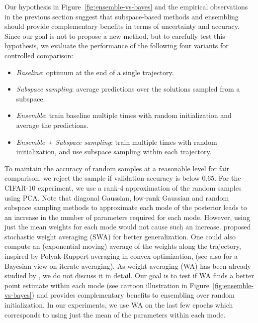 \documentclass{article}
\begin{document}
%

%

Our hypothesis in Figure~\ref{fig:ensemble-vs-bayes} and the empirical observations in the previous section suggest that subspace-based methods and ensembling should provide complementary benefits in terms of uncertainty and accuracy. %
%
%
%
%
Since our goal is not to propose a new method, but to carefully test this hypothesis, we
evaluate the performance of the following four variants for controlled comparison: %
\begin{itemize}\itemsep0em
\item \emph{Baseline}: optimum at the end of a single  trajectory.
\item \emph{Subspace sampling}: average predictions over the solutions sampled from a subspace.
\item \emph{Ensemble}: train baseline multiple times with random initialization and average the predictions.
\item \emph{Ensemble + Subspace sampling}: train multiple times with random initialization, and use subspace sampling within each trajectory.
\end{itemize}

{To maintain the accuracy of random samples at a reasonable level for fair comparison, we reject the sample if validation accuracy is below $0.65$. For the CIFAR-10 experiment, we  use a rank-4 approximation of the random samples using PCA.} 
Note that diagonal Gaussian, low-rank Gaussian and random subspace sampling methods to approximate each mode of the posterior leads to an increase in the number of parameters required for each mode.  However, using just the mean weights for each mode would not cause such an increase.  \citet{izmailov2018averaging} proposed stochastic weight averaging (SWA) for better generalization.   
One could also compute an (exponential moving) average of the weights along the trajectory, inspired by Polyak-Ruppert averaging in convex optimization, (see also \citep{mandt2017stochastic} for a Bayesian view on iterate averaging). As weight averaging (WA) has been already studied by \citet{izmailov2018averaging}, we do not discuss it in detail. 
%
%
Our goal is to test if WA finds a better point estimate within each mode (see cartoon illustration in Figure~\ref{fig:ensemble-vs-bayes}) and
provides complementary benefits to ensembling over random initialization. %
%
In our experiments, we use WA on the last few epochs which corresponds to using just the mean of the parameters within each mode.   
%
%
%
\end{document}

